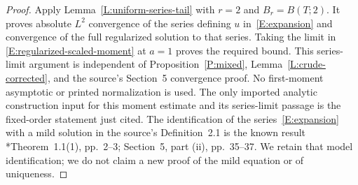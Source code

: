 \documentclass[12pt]{article}
\numberwithin{equation}{section}
\theoremstyle{definition}
\begin{document}
\begin{proof}
  Apply Lemma~\ref{L:uniform-series-tail} with $r=2$ and
  $B_r=B(T;2)$. It proves absolute $L^2$ convergence of the series
  defining $u$ in~\eqref{E:expansion} and convergence of the full
  regularized solution to that series. Taking the limit in
  \eqref{E:regularized-scaled-moment} at $a=1$ proves the required bound.
  This series-limit argument is independent of
  Proposition~\ref{P:mixed}, Lemma~\ref{L:crude-corrected}, and the
  source's Section~5 convergence proof. No first-moment asymptotic or
  printed normalization is used. The only imported analytic construction
  input for this moment estimate and its series-limit passage is the
  fixed-order statement just cited.
  The identification of the series~\eqref{E:expansion} with a mild
  solution in the source's Definition~2.1 is the known result
  \cite{chen:author2026:time-dependency}*{Theorem~1.1(1), pp.~2--3;
  Section~5, part (ii), pp.~35--37}. We retain that model identification; we do not
  claim a new proof of the mild equation or of uniqueness.


\end{proof}
\end{document}
